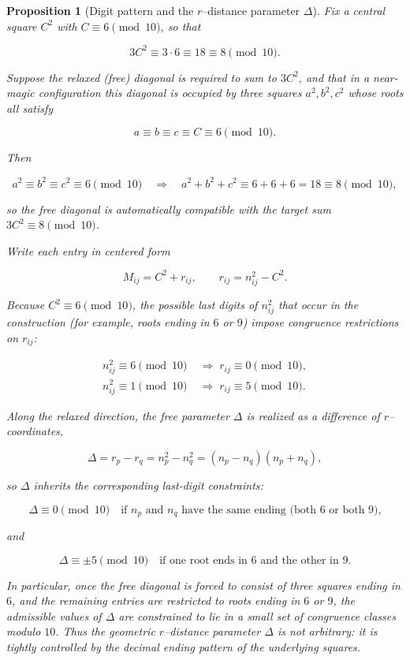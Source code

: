 \documentclass[12pt]{article}
\newtheorem{proposition}{Proposition}
\begin{document}
\begin{proposition}[Digit pattern and the $r$--distance parameter $\Delta$]
Fix a central square $C^2$ with $C \equiv 6 \pmod{10}$, so that


\[
3C^2 \equiv 3\cdot 6 \equiv 18 \equiv 8 \pmod{10}.
\]


Suppose the relaxed (free) diagonal is required to sum to $3C^2$, and that in a
near-magic configuration this diagonal is occupied by three squares
$a^2,b^2,c^2$ whose roots all satisfy


\[
a \equiv b \equiv c \equiv C \equiv 6 \pmod{10}.
\]


Then


\[
a^2 \equiv b^2 \equiv c^2 \equiv 6 \pmod{10}
\quad\Longrightarrow\quad
a^2 + b^2 + c^2 \equiv 6+6+6 = 18 \equiv 8 \pmod{10},
\]


so the free diagonal is automatically compatible with the target sum
$3C^2 \equiv 8 \pmod{10}$.

Write each entry in centered form


\[
M_{ij} = C^2 + r_{ij}, \qquad r_{ij} = n_{ij}^2 - C^2.
\]


Because $C^2 \equiv 6 \pmod{10}$, the possible last digits of $n_{ij}^2$ that
occur in the construction (for example, roots ending in $6$ or $9$) impose
congruence restrictions on $r_{ij}$:


\[
\begin{aligned}
n_{ij}^2 \equiv 6 \pmod{10} &\;\Longrightarrow\; r_{ij} \equiv 0 \pmod{10},\\
n_{ij}^2 \equiv 1 \pmod{10} &\;\Longrightarrow\; r_{ij} \equiv 5 \pmod{10}.
\end{aligned}
\]


Along the relaxed direction, the free parameter $\Delta$ is realized as a
difference of $r$--coordinates,


\[
\Delta = r_{p} - r_{q} = n_{p}^2 - n_{q}^2 = (n_{p}-n_{q})(n_{p}+n_{q}),
\]


so $\Delta$ inherits the corresponding last-digit constraints:


\[
\Delta \equiv 0 \pmod{10}
\quad\text{if $n_{p}$ and $n_{q}$ have the same ending (both $6$ or both $9$),}
\]


and


\[
\Delta \equiv \pm 5 \pmod{10}
\quad\text{if one root ends in $6$ and the other in $9$.}
\]


In particular, once the free diagonal is forced to consist of three squares
ending in $6$, and the remaining entries are restricted to roots ending in $6$
or $9$, the admissible values of $\Delta$ are constrained to lie in a small
set of congruence classes modulo $10$.  Thus the geometric $r$--distance
parameter $\Delta$ is not arbitrary: it is tightly controlled by the decimal
ending pattern of the underlying squares.
\end{proposition}
\end{document}
